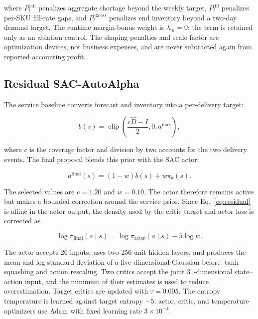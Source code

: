 \documentclass[pdflatex,sn-mathphys-num]{sn-jnl}
\begin{document}
where $P_t^{\mathrm{tail}}$ penalizes aggregate shortage beyond the weekly target, $P_t^{\mathrm{fill}}$ penalizes per-SKU fill-rate gaps, and $P_t^{\mathrm{excess}}$ penalizes end inventory beyond a two-day demand target. The runtime margin-bonus weight is $\lambda_m=0$; the term is retained only as an ablation control. The shaping penalties and scale factor are optimization devices, not business expenses, and are never subtracted again from reported accounting profit.

\subsection{Residual SAC-AutoAlpha}\label{subsec:residual-sac}

The service baseline converts forecast and inventory into a per-delivery target:

\begin{equation}
b(s)=\operatorname{clip}\left(
\frac{c\widehat{D}-I}{2},0,a^{\max}\right),
\label{eq:baseline}
\end{equation}

where $c$ is the coverage factor and division by two accounts for the two delivery events. The final proposal blends this prior with the SAC actor:

\begin{equation}
a^{\mathrm{final}}(s)=(1-w)b(s)+w\pi_\theta(s).
\label{eq:residual}
\end{equation}

The selected values are $c=1.20$ and $w=0.10$. The actor therefore remains active but makes a bounded correction around the service prior. Since Eq.~\eqref{eq:residual} is affine in the actor output, the density used by the critic target and actor loss is corrected as

\begin{equation}
\log\pi_{\mathrm{final}}(a\mid s)
=\log\pi_{\mathrm{actor}}(a\mid s)-5\log w.
\label{eq:jacobian}
\end{equation}

The actor accepts 26 inputs, uses two 256-unit hidden layers, and produces the mean and log standard deviation of a five-dimensional Gaussian before $\tanh$ squashing and action rescaling. Two critics accept the joint 31-dimensional state--action input, and the minimum of their estimates is used to reduce overestimation. Target critics are updated with $\tau=0.005$. The entropy temperature is learned against target entropy $-5$; actor, critic, and temperature optimizers use Adam with fixed learning rate $3\times10^{-4}$.
\end{document}

